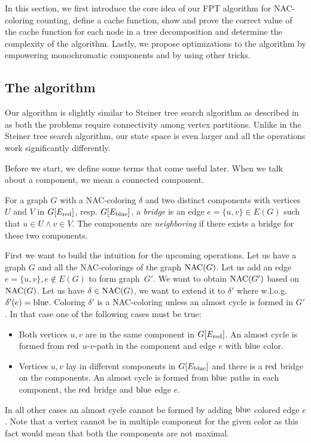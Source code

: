 In this section, we first introduce the core idea of
our FPT algorithm for NAC-coloring counting,
define a cache function,
show and prove the correct value of the cache function for each node in a tree decomposition
and determine the complexity of the algorithm.
Lastly, we propose optimizations to the algorithm by empowering monochromatic components
and by using other tricks.

\subsection{The algorithm}

Our algorithm is slightly similar to Steiner tree search algorithm
as described in~\cite{book_parametrized_algorithms} as both the problems require connectivity
among vertex partitions. Unlike in the Steiner tree search algorithm,
our state space is even larger and all the operations work significantly differently.

Before we start, we define some terms that come useful later.
When we talk about a component, we mean a connected component.
%
\begin{definition}
	For a graph \( G \) with a NAC-coloring \( \delta \)
	and two distinct components
	with vertices \( U \) and \( V \)
	in \( G[E_\text{red}] \), resp. \( G[E_\text{blue}] \),
	a \emph{bridge} is an edge \( e = \{u, v\} \in E(G) \)
	such that \( u \in U \land v \in V \).
	The components are \emph{neighboring} if there exists
	a bridge for these two components.
\end{definition}
%

First we want to build the intuition for the upcoming operations.
Let us have a graph \( G \) and all the NAC-colorings of the graph \( \operatorname{NAC}(G) \).
Let us add an edge \( e = \{u, v\}, e \not\in E(G) \) to form graph~\( G' \).
We want to obtain \( \operatorname{NAC}(G') \) based on \( \operatorname{NAC} (G) \).
%
Let us have \( \delta \in \operatorname{NAC}(G) \),
we want to extend it to \( \delta' \) where w.l.o.g.\ \( \delta'(e) = \text{blue} \).
Coloring \( \delta' \) is a NAC-coloring unless an almost cycle is formed in \( G' \).
In that case one of the following cases must be true:
%
\begin{itemize}
	\item Both vertices \( u, v \) are in the same component in \( G[E_\text{red}] \).
	      An almost cycle is formed
	      from \( \text{red} \) \( u \)-\( v \)-path in the component
	      and edge \( e \) with \( \text{blue} \) color.
	\item Vertices \( u, v \) lay in different components in \( G[E_\text{blue}] \)
	      and there is a \( \text{red} \) bridge on the components.
	      An almost cycle is formed from \( \text{blue} \) paths in each component,
	      the \( \text{red} \) bridge and \( \text{blue} \) edge \( e \).
\end{itemize}
%
In all other cases an almost cycle cannot be formed by adding \( \text{blue} \) colored edge \( e \).
Note that a vertex cannot be in multiple component for the given color
as this fact would mean that both the components are not maximal.

